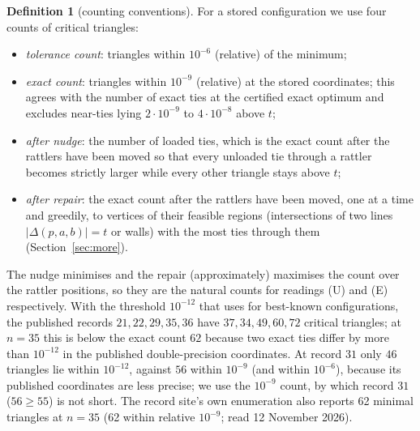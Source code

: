 \documentclass[11pt]{amsart}
\theoremstyle{definition}
\newtheorem{definition}[theorem]{Definition}
\begin{document}
\begin{definition}[counting conventions]\label{def:conv}
For a stored configuration we use four counts of critical triangles:
\begin{itemize}
\item \emph{tolerance count}: triangles within $10^{-6}$ (relative) of the minimum;
\item \emph{exact count}: triangles within $10^{-9}$ (relative) at the stored coordinates; this agrees with the number of exact ties at the certified exact optimum and excludes near-ties lying $2\cdot10^{-9}$ to $4\cdot10^{-8}$ above $t$;
\item \emph{after nudge}: the number of loaded ties, which is the exact count after the rattlers have been moved so that every unloaded tie through a rattler becomes strictly larger while every other triangle stays above $t$;
\item \emph{after repair}: the exact count after the rattlers have been moved, one at a time and greedily, to vertices of their feasible regions (intersections of two lines $|\Delta(p,a,b)| = t$ or walls) with the most ties through them (Section~\ref{sec:more}).
\end{itemize}
\end{definition}
The nudge minimises and the repair (approximately) maximises the count over the rattler positions, so they are the natural counts for readings (U) and (E) respectively. With the threshold $10^{-12}$ that \cite[Sec.~7]{SM} uses for best-known configurations, the published records $21, 22, 29, 35, 36$ have $37, 34, 49, 60, 72$ critical triangles; at $n = 35$ this is below the exact count $62$ because two exact ties differ by more than $10^{-12}$ in the published double-precision coordinates. At record $31$ only $46$ triangles lie within $10^{-12}$, against $56$ within $10^{-9}$ (and within $10^{-6}$), because its published coordinates are less precise; we use the $10^{-9}$ count, by which record $31$ ($56 \ge 55$) is not short. The record site's own enumeration also reports 62 minimal triangles at $n = 35$ (62 within relative $10^{-9}$; read 12 November 2026). %

\end{document}
